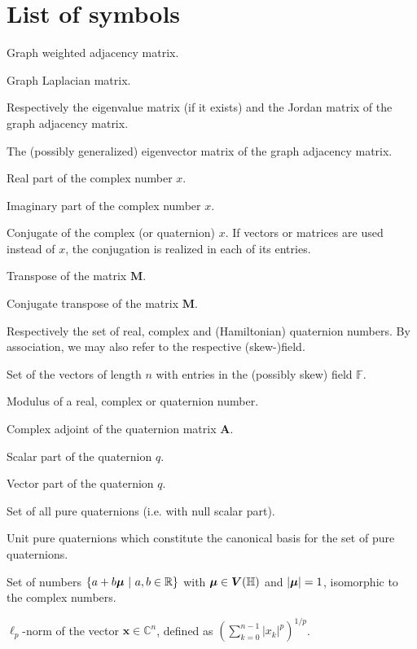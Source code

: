 \chapter*{List of symbols}
\label{sec:symbols}


\begin{description}[leftmargin=8em,style=nextline]
    \item[$ \mathbf{A} $] Graph weighted adjacency matrix.
    \item[$ \mathbf{L} $] Graph Laplacian matrix.
    \item[$ \mathbf{\Lambda}, \mathbf{J} $] Respectively the eigenvalue matrix (if it exists) and the Jordan matrix of the graph adjacency matrix.
    \item[$ \mathbf{V} $] The (possibly generalized) eigenvector matrix of the graph adjacency matrix.
    \item[$\mathcal{R}e \{ x \}$] Real part of the complex number $x$.
    \item[$\mathcal{I}m \{ x \}$] Imaginary part of the complex number $x$.
    \item[$ \overline{x} $] Conjugate of the complex (or quaternion) $x$. If vectors or matrices are used instead of $x$, the conjugation is realized in each of its entries.
    \item[$\mathbf{M}^T$] Transpose of the matrix $\mathbf{M}$.
    \item[$\mathbf{M}^H$] Conjugate transpose of the matrix $\mathbf{M}$.
    \item[$\mathbb{R}$, $\mathbb{C}$ \textnormal{and} $\mathbb{H}$] Respectively the set of real, complex and (Hamiltonian) quaternion numbers. By association, we may also refer to the respective (skew-)field.
    \item[$\mathbb{F}^n$] Set of the vectors of length $n$ with entries in the (possibly skew) field $\mathbb{F}$.
    \item[$ | \cdot | $] Modulus of a real, complex or quaternion number.
    \item[$ \rchi_A $] Complex adjoint of the quaternion matrix $ \mathbf{A} $.
    \item[$ S(q) $] Scalar part of the quaternion $q$.
    \item[$ \qV(q) $] Vector part of the quaternion $q$.
    \item[$ \qV(\mathbb{H}) $] Set of all pure quaternions (i.e. with null scalar part).
    \item[$ \qi $, $ \qj $ \textnormal{and} $ \qk $] Unit pure quaternions which constitute the canonical basis for the set of pure quaternions.
    \item[$ \mathbb{C}_{\qmu}$] Set of numbers $\{ a + b\boldsymbol{\mu} \ | \ a, b \in \mathbb{R} \}$ with $\boldsymbol{\mu} \in \boldsymbol{V}(\mathbb{H})$ and $|\boldsymbol{\mu}| = 1$, isomorphic to the complex numbers.
    \item[$ \Vert \mathbf{x}\Vert_p $] $ \ell_p $-norm of the vector $\mathbf{x} \in \mathbb{C}^n$, defined as $\left(\sum_{k=0}^{n-1} |x_k|^p\right)^{1/p}$.
\end{description}